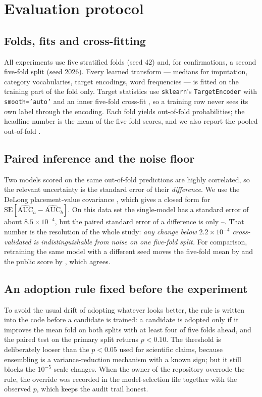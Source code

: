 \section{Evaluation protocol}
\label{sec:protocol}

\subsection{Folds, fits and cross-fitting}
All experiments use five stratified folds (seed 42) and, for confirmations, a second five-fold
split (seed 2026). Every learned transform --- medians for imputation, category vocabularies,
target encodings, word frequencies --- is fitted on the training part of the fold only. Target
statistics use \texttt{sklearn}'s \texttt{TargetEncoder} with \texttt{smooth='auto'} and an inner
five-fold cross-fit \citep{miccibarreca2001}, so a training row never sees its own label
through the encoding. Each fold yields out-of-fold probabilities; the headline number is the
mean of the five fold scores, and we also report the pooled out-of-fold \auc{}.

\subsection{Paired inference and the noise floor}
Two models scored on the same out-of-fold predictions are highly correlated, so the relevant
uncertainty is the standard error of their \emph{difference}. We use the DeLong placement-value
covariance \citep{delong1988}, which gives a closed form for
$\mathrm{SE}[\widehat{\mathrm{AUC}}_a-\widehat{\mathrm{AUC}}_b]$. On this data set the single-model
\auc{} has a standard error of about $8.5\times10^{-4}$, but the paired standard error of a
difference is only --. That number is the resolution of the whole study:
\emph{any change below $2.2\times10^{-4}$ cross-validated is indistinguishable from noise on one
five-fold split.} For comparison, retraining the same model with a different seed moves the
five-fold mean by  and the public score by , which agrees.

\subsection{An adoption rule fixed before the experiment}
To avoid the usual drift of adopting whatever looks better, the rule is written into the code
before a candidate is trained: a candidate is adopted only if it improves the mean fold \auc{}
on both splits with at least four of five folds ahead, and the paired test on the primary split
returns $p<0.10$. The threshold is deliberately looser than the $p<0.05$ used for scientific
claims, because ensembling is a variance-reduction mechanism with a known sign; but it still
blocks the $10^{-5}$-scale changes. When the owner of the repository overrode the rule, the
override was recorded in the model-selection file together with the observed $p$, which keeps
the audit trail honest.

